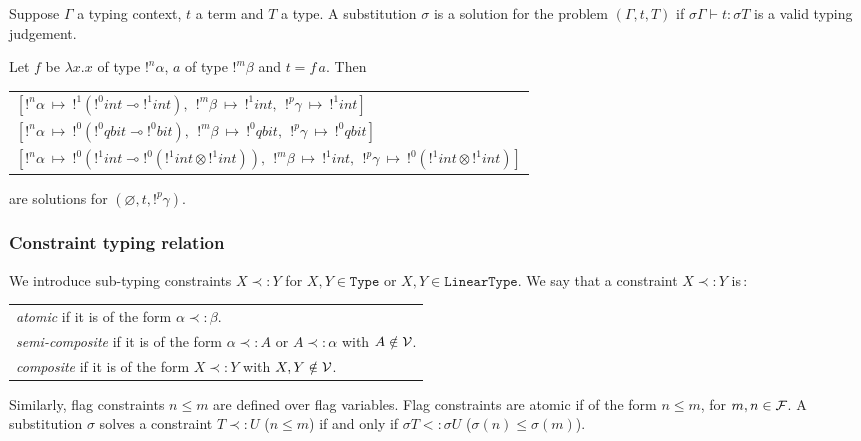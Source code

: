 \begin{defn}
	\label{decl_problem}
	Suppose $\Gamma$ a typing context, $t$ a term and $T$ a type. A substitution $\sigma$ is a solution for the problem $(\Gamma, t, T)$ if
	$\sigma \Gamma \vdash t : \sigma T$ is a valid typing judgement.
\end{defn}

\begin{exmp} Let $f$ be $\lambda x.x$ of type $!^n \alpha$, $a$ of type $!^m \beta$ and $t = f \, a$. Then
	\begin{center}
	\begin{tabular}{l}
		$[!^n\alpha ~\mapsto~ !^1(!^0int \multimap !^1int),~~ !^m\beta ~\mapsto~ !^1int,~~ !^p\gamma ~\mapsto~ !^1int]$ \\
		$[!^n\alpha ~\mapsto~ !^0(!^0qbit \multimap !^0bit),~~ !^m\beta ~\mapsto~ !^0qbit,~~ !^p\gamma ~\mapsto~ !^0qbit]$ \\
		$[!^n\alpha ~\mapsto~ !^0(!^1int \multimap !^0(!^1int \otimes !^1int)),
			~~ !^m\beta ~\mapsto~ !^1int,
			~~ !^p\gamma ~\mapsto~ !^0(!^1int \otimes !^1int)]$
	\end{tabular}
	\end{center}
	are solutions for $(\varnothing, t, !^p \gamma)$.
\end{exmp}

\subsubsection{Constraint typing relation}

\begin{defn} We introduce sub-typing constraints $X \prec: Y$ for $X, Y \in \texttt{Type}$ or $X, Y \in \texttt{LinearType}$.
We say that a constraint $X \prec: Y$ is\,:
		\begin{center}
		\begin{tabular}{l}
			\textit{atomic} if it is of the form $\alpha \prec: \beta$. \\
			\textit{semi-composite} if it is of the form $\alpha \prec: A$ or $A \prec: \alpha$ with $A \notin \mathcal{V}$. \\
			\textit{composite} if it is of the form $X \prec: Y$ with $X, Y \notin \mathcal{V}$.
		\end{tabular}
		\end{center}
  Similarly, flag constraints $n \le m$ are defined over flag variables. Flag constraints are atomic if of the form $n \le m$,
  for $m, n\in \mathcal{F}$.
  A substitution $\sigma$ solves a constraint $T \prec: U$ ($n \le m$) if and only if $\sigma T <: \sigma U$ ($\sigma(n) \le \sigma(m)$).
\end{defn}

